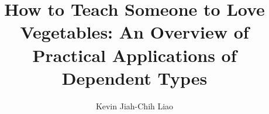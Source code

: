 \documentclass[a4paper,12pt,twoside]{report}
\begin{document}
\title{\LARGE {\bf How to Teach Someone to Love Vegetables: An Overview of Practical Applications of Dependent Types}\\
 \vspace*{6mm}
}

\author{Kevin Jiah-Chih Liao}

\normallinespacing
\maketitle

\preface

% 
%
% 
\body



\appendix




\end{document}
